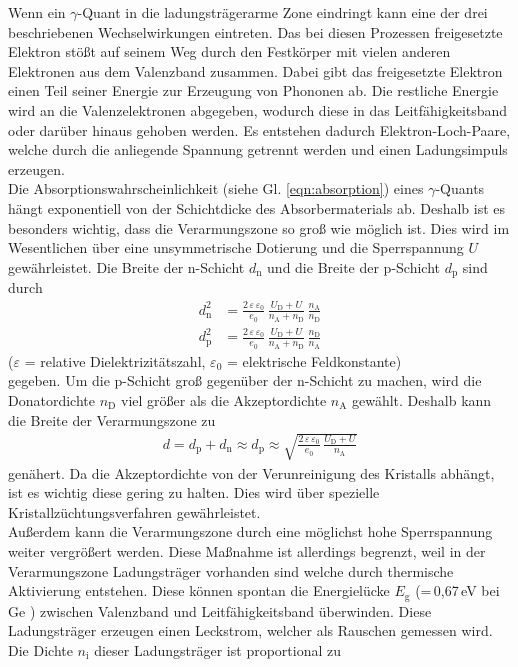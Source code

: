 Wenn ein $\gamma$-Quant in die ladungsträgerarme Zone eindringt kann eine der drei beschriebenen Wechselwirkungen eintreten. Das bei diesen Prozessen freigesetzte Elektron stößt auf seinem Weg durch den Festkörper mit vielen anderen Elektronen aus dem Valenzband zusammen. Dabei gibt das freigesetzte Elektron einen Teil seiner Energie zur Erzeugung von Phononen ab. Die restliche Energie wird an die Valenzelektronen abgegeben, wodurch diese in das Leitfähigkeitsband oder darüber hinaus gehoben werden. Es entstehen dadurch Elektron-Loch-Paare, welche durch die anliegende Spannung getrennt werden und einen Ladungsimpuls erzeugen. \\
Die Absorptionswahrscheinlichkeit (siehe Gl. \eqref{eqn:absorption}) eines $\gamma$-Quants hängt exponentiell von der Schichtdicke des Absorbermaterials ab. Deshalb ist es besonders wichtig, dass die Verarmungszone so groß wie möglich ist. Dies wird im Wesentlichen über eine unsymmetrische Dotierung und die Sperrspannung $U$ gewährleistet. Die Breite der n-Schicht $d_\text{n}$ und die Breite der p-Schicht $d_\text{p}$ sind durch
\begin{align}
	d_\text{n}^2 &= \frac{2\,\varepsilon\,\varepsilon_0} {e_0} \, \frac{U_\text{D} + U}{n_\text{A} + n_\text{D}} \, \frac{n_\text{A}}{n_\text{D}} \\
	d_\text{p}^2 &= \frac{2\,\varepsilon\,\varepsilon_0} {e_0} \, \frac{U_\text{D} + U} {n_\text{A} + n_\text{D}} \, \frac{n_\text{D}}{n_\text{A}}
\end{align}
\hfil {\footnotesize($\varepsilon$ = relative Dielektrizitätszahl, $\varepsilon_0$ = elektrische Feldkonstante)} \hfil \\
gegeben. Um die p-Schicht groß gegenüber der n-Schicht zu machen, wird die Donatordichte $n_\text{D}$ viel größer als die Akzeptordichte $n_\text{A}$ gewählt. Deshalb kann die Breite der Verarmungszone zu
\begin{align}
	d = d_\text{p} + d_\text{n} \approx d_\text{p} \approx \sqrt{\frac{2\,\varepsilon\,\varepsilon_0} {e_0} \, \frac{U_\text{D} + U}{n_\text{A}}}
\end{align}
genähert. Da die Akzeptordichte von der Verunreinigung des Kristalls abhängt, ist es wichtig diese gering zu halten. Dies wird über spezielle Kristallzüchtungsverfahren gewährleistet. \\
Außerdem kann die Verarmungszone durch eine möglichst hohe Sperrspannung weiter vergrößert werden. Diese Maßnahme ist allerdings begrenzt, weil in der Verarmungszone Ladungsträger vorhanden sind welche durch thermische Aktivierung entstehen. Diese können spontan die Energielücke $E_\text{g}$ (=\,0,67\,eV bei Ge \cite[13]{V18}) zwischen Valenzband und Leitfähigkeitsband überwinden. Diese Ladungsträger erzeugen einen Leckstrom, welcher als Rauschen gemessen wird. Die Dichte $n_\text{i}$ dieser Ladungsträger ist proportional zu
